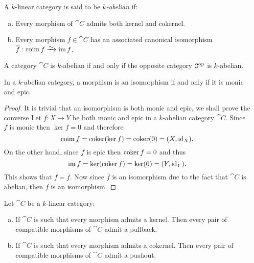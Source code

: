 \begin{definition}
\label{def:abelian-category}
A \(k\)-linear category is said to be \emph{\(k\)-abelian} if:
\begin{enumerate}[(a)]\setlength\itemsep{0em}
\item Every morphism of \(\cat C\) admits both kernel and cokernel.
\item Every morphism \(f \in \cat C\) has an associated canonical isomorphism
  \(\overline f: \coim f \isoto \im f\).
\end{enumerate}
\end{definition}

\begin{corollary}
\label{cor:abelian-cat-iff-op-abelian}
A category \(\cat C\) is \(k\)-abelian if and only if the opposite category
\(\texttt C^{\mathrm{op}}\) is \(k\)-abelian.
\end{corollary}

\begin{lemma}
\label{lem:abelian-cat-iso-iff-monic-and-epic}
In a \(k\)-abelian category, a morphism is an isomorphism if and only if it is
monic and epic.
\end{lemma}

\begin{proof}
It is trivial that an isomorphism is both monic and epic, we shall prove the
converse Let \(f: X \to Y\) be both monic and epic in a \(k\)-abelian category
\(\cat C\). Since \(f\) is monic then \(\ker f = 0\) and therefore
\[
\operatorname{coim} f = \operatorname{coker}(\ker f) = \operatorname{coker}(0) = (X, \operatorname{id}_X).
\]
On the other hand, since \(f\) is epic then \(\operatorname{coker} f = 0\) and thus
\[
\operatorname{im} f = \ker(\operatorname{coker} f) = \ker(0) = (Y, \operatorname{id}_Y).
\]
This shows that \(f = \overline f\). Now since \(\overline f\) is an isomorphism
due to the fact that \(\cat C\) is abelian, then \(f\) is an isomorphism.
\end{proof}

\begin{theorem}
\label{thm:k-linear-cat-all-co-kernels-then-admits-all-pullbacks-pushouts}
Let \(\cat C\) be a \(k\)-linear category:
\begin{enumerate}[(a)]\setlength\itemsep{0em}
\item If \(\cat C\) is such that every morphism admits a kernel. Then every pair
  of compatible morphisms of \(\cat C\) admit a pullback.

\item If \(\cat C\) is such that every morphism admits a cokernel. Then every
  pair of compatible morphisms of \(\cat C\) admit a pushout.
\end{enumerate}
\end{theorem}

